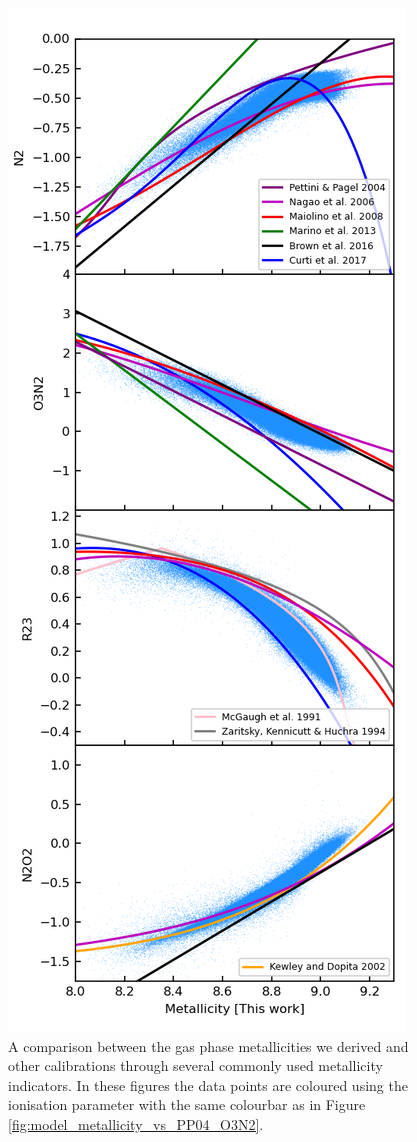 \documentclass[fleqn,usenatbib]{mnras}
\begin{document}
\begin{figure}
    \centering
    \includegraphics[width=0.95\columnwidth]{figures/figA1.png}
    \caption{A comparison between the gas phase metallicities we derived and other calibrations through several commonly used metallicity indicators. In these figures the data points are coloured using the ionisation parameter with the same colourbar as in Figure \ref{fig:model_metallicity_vs_PP04_O3N2}.}
    \label{fig:metallicity_indicator_comparison}
\end{figure}



\bsp	%
\label{lastpage}
\end{document}
